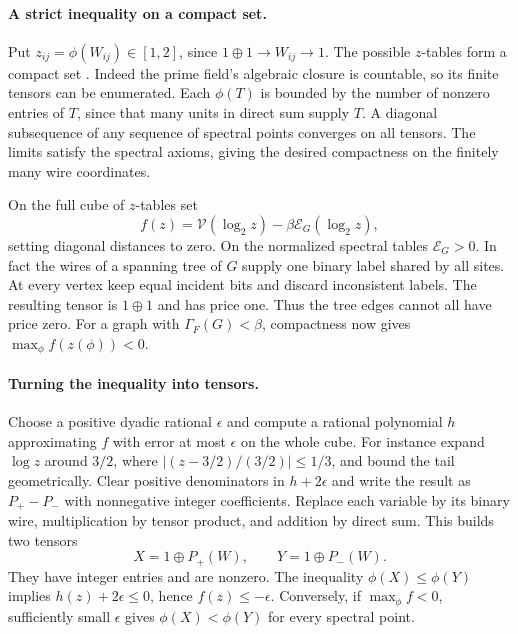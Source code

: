 \documentclass[11pt]{article}
\theoremstyle{definition}
\newcommand{\Var}{\mathcal V}
\newcommand{\En}{\mathcal E}
\newcommand{\res}{\longrightarrow}
\begin{document}
\paragraph{A strict inequality on a compact set.}
Put \(z_{ij}=\phi(W_{ij})\in[1,2]\), since \(1\oplus1\res W_{ij}\res1\).
The possible \(z\)-tables form a compact set \cite{euclid}. Indeed the
prime field's algebraic closure is countable, so its finite tensors can
be enumerated. Each \(\phi(T)\) is bounded by the number of nonzero
entries of \(T\), since that many units in direct sum supply \(T\).
A diagonal subsequence of any sequence of spectral points converges on
all tensors. The limits satisfy the spectral axioms, giving the desired
compactness on the finitely many wire coordinates.

On the full cube of \(z\)-tables set
\[
          f(z)=\Var(\log_2 z)-\beta\En_G(\log_2 z),
\]
setting diagonal distances to zero. On the normalized spectral tables
\(\En_G>0\). In fact the wires of a spanning tree of \(G\) supply one
binary label shared by all sites. At every vertex keep equal incident
bits and discard inconsistent labels. The resulting tensor is \(1\oplus1\)
and has price one. Thus the tree edges cannot all have price zero.
For a graph with \(\Gamma_F(G)<\beta\), compactness now gives
\(\max_\phi f(z(\phi))<0\).

\paragraph{Turning the inequality into tensors.}
Choose a positive dyadic rational \(\epsilon\) and compute a rational
polynomial \(h\) approximating \(f\) with error at most \(\epsilon\) on the
whole cube. For instance expand \(\log z\) around \(3/2\), where
\(|(z-3/2)/(3/2)|\le1/3\), and bound the tail geometrically.
Clear positive denominators in \(h+2\epsilon\) and write the result as
\(P_+-P_-\) with nonnegative integer coefficients. Replace each variable
by its binary wire, multiplication by tensor product, and addition by
direct sum. This builds two tensors
\[
                       X=1\oplus P_+(W),\qquad Y=1\oplus P_-(W).
\]
They have integer entries and are nonzero. The inequality
\(\phi(X)\le\phi(Y)\) implies \(h(z)+2\epsilon\le0\), hence
\(f(z)\le-\epsilon\). Conversely, if \(\max_\phi f<0\), sufficiently small
\(\epsilon\) gives \(\phi(X)<\phi(Y)\) for every spectral point.
\end{document}

